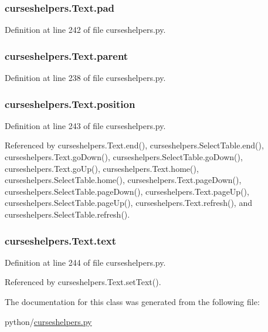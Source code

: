 \subsubsection[{pad}]{\setlength{\rightskip}{0pt plus 5cm}curseshelpers.\-Text.\-pad}\label{classcurseshelpers_1_1Text_a35d7c4f3277e3b6ac5c778ffffb6a9be}


Definition at line 242 of file curseshelpers.\-py.

\subsubsection[{parent}]{\setlength{\rightskip}{0pt plus 5cm}curseshelpers.\-Text.\-parent}\label{classcurseshelpers_1_1Text_a35b8e8038798bc92d3d529cc9f9a98e6}


Definition at line 238 of file curseshelpers.\-py.

\subsubsection[{position}]{\setlength{\rightskip}{0pt plus 5cm}curseshelpers.\-Text.\-position}\label{classcurseshelpers_1_1Text_aef71ab86df8cc8b825e5cd4dd74b755c}


Definition at line 243 of file curseshelpers.\-py.



Referenced by curseshelpers.\-Text.\-end(), curseshelpers.\-Select\-Table.\-end(), curseshelpers.\-Text.\-go\-Down(), curseshelpers.\-Select\-Table.\-go\-Down(), curseshelpers.\-Text.\-go\-Up(), curseshelpers.\-Text.\-home(), curseshelpers.\-Select\-Table.\-home(), curseshelpers.\-Text.\-page\-Down(), curseshelpers.\-Select\-Table.\-page\-Down(), curseshelpers.\-Text.\-page\-Up(), curseshelpers.\-Select\-Table.\-page\-Up(), curseshelpers.\-Text.\-refresh(), and curseshelpers.\-Select\-Table.\-refresh().

\subsubsection[{text}]{\setlength{\rightskip}{0pt plus 5cm}curseshelpers.\-Text.\-text}\label{classcurseshelpers_1_1Text_a222182a72920f287764749d8d65255ea}


Definition at line 244 of file curseshelpers.\-py.



Referenced by curseshelpers.\-Text.\-set\-Text().



The documentation for this class was generated from the following file\-:\begin{DoxyCompactItemize}
\item 
python/\hyperlink{curseshelpers_8py}{curseshelpers.\-py}\end{DoxyCompactItemize}
